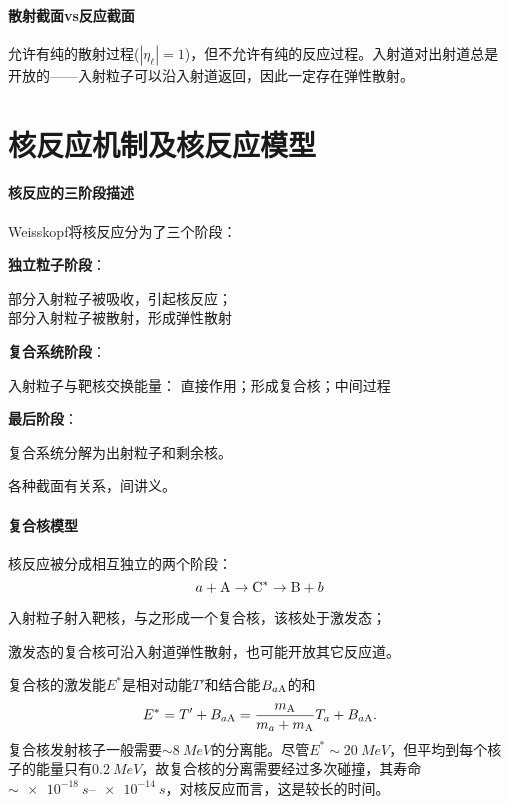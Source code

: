 \paragraph{散射截面vs反应截面}
\begin{center}
\end{center}
允许有纯的散射过程($|\eta_\ell|=1$)，但不允许有纯的反应过程。入射道对出射道总是开放的——入射粒子可以沿入射道返回，因此一定存在弹性散射。
\section{核反应机制及核反应模型}
\paragraph{核反应的三阶段描述}Weisskopf将核反应分为了三个阶段：
\begin{compactenum}
	\item \textbf{独立粒子阶段}：
	
	部分入射粒子被吸收，引起核反应；\\
	部分入射粒子被散射，形成弹性散射
	\item \textbf{复合系统阶段}：
	
	入射粒子与靶核交换能量：
	直接作用；形成复合核；中间过程
	\item \textbf{最后阶段}：
	
	复合系统分解为出射粒子和剩余核。
\end{compactenum}
各种截面有关系，间讲义。
\paragraph{复合核模型}核反应被分成相互独立的两个阶段：
\[
	a+\mathrm{A}\to\mathrm{C}^\ast\to\mathrm{B}+b
\]
\begin{compactenum}
	\item 入射粒子射入靶核，与之形成一个复合核，该核处于激发态；
	\item 激发态的复合核可沿入射道弹性散射，也可能开放其它反应道。
\end{compactenum}
复合核的激发能$E^\ast$是相对动能$T'$和结合能$B_{a\mathrm{A}}$的和
\begin{align}
	E^\ast=T'+B_{a\mathrm{A}}=\frac{m_{\mathrm{A}}}{m_a+m_{\mathrm{A}}}T_a+B_{a\mathrm{A}}.
\end{align}
复合核发射核子一般需要$\sim\SI{8}{MeV}$的分离能。尽管$E^\ast\sim\SI{20}{MeV}$，但平均到每个核子的能量只有$\SI{0.2}{MeV}$，故复合核的分离需要经过多次碰撞，其寿命$\sim\SIrange{e-18}{e-14}{s}$，对核反应而言，这是较长的时间。

